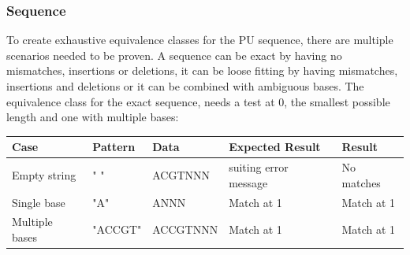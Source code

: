 \documentclass[12pt]{article}
\newcommand{\pu}{PU }
\begin{document}
\subsubsection{Sequence}
To create exhaustive equivalence classes for the \pu sequence, there are multiple scenarios needed to be proven.
A sequence can be exact by having no mismatches, insertions or deletions, it can be loose fitting by having 
mismatches, insertions and deletions or it can be combined with ambiguous bases.
The equivalence class for the exact sequence, needs a test at 0, the smallest possible length and one with multiple
bases:
\begin{table}[H]
\begin{tabular}{p{4cm}|p{3.6cm}|p{2.5cm}|p{2.2cm}|p{2.2cm}}
Case 			& Pattern & Data & Expected Result & Result \\ \hline
Empty string		& " " & ACGTNNN & suiting error message & No matches \\ \hline
Single base 		& "A" & ANNN & Match at 1 & Match at 1\\ \hline
Multiple bases	& "ACCGT" & ACCGTNNN & Match at 1 & Match at 1 \\ \hline
\end{tabular}
\end{table}
\end{document}
